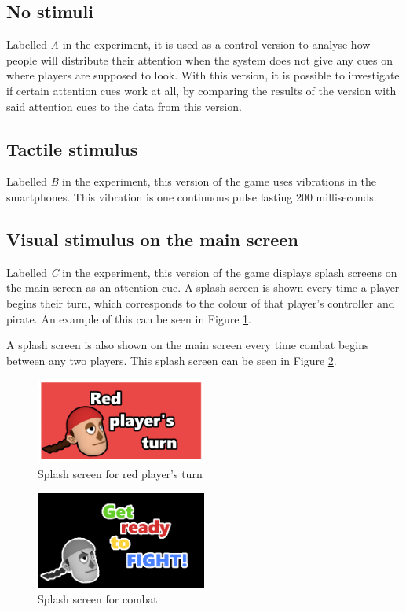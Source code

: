 \subsection{No stimuli}\label{sub:no_feedback}
Labelled \textit{A} in the experiment, it is used as a control version to analyse how people will distribute their attention when the system does not give any cues on where players are supposed to look. With this version, it is possible to investigate if certain attention cues work at all, by comparing the results of the version with said attention cues to the data from this version.

\subsection{Tactile stimulus}\label{sub:tactile_feedback}
Labelled \textit{B} in the experiment, this version of the game uses vibrations in the smartphones. This vibration is one continuous pulse lasting 200 milliseconds.

\subsection{Visual stimulus on the main screen}\label{sub:visual_main}
Labelled \textit{C} in the experiment, this version of the game displays splash screens on the main screen as an attention cue. A splash screen is shown every time a player begins their turn, which corresponds to the colour of that player's controller and pirate. An example of this can be seen in Figure \ref{fig:redturn}.

A splash screen is also shown on the main screen every time combat begins between any two players. This splash screen can be seen in Figure \ref{fig:fight_splash}.

\begin{figure}[h!]
	\centering
	\includegraphics[width=0.5\textwidth]{figures/redturn.png}
	\caption{Splash screen for red player's turn}\label{fig:redturn}
\end{figure}

\begin{figure}[h!]
	\centering
	\includegraphics[width=0.5\textwidth]{figures/getready.png}
	\caption{Splash screen for combat}\label{fig:fight_splash}
\end{figure}

